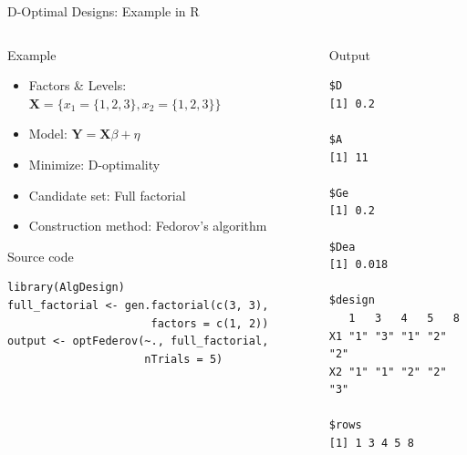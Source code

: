 \documentclass[10pt, compress, aspectratio=169, xcolor={table,usenames,dvipsnames}]{beamer}
\begin{document}
\begin{frame}[fragile,label={sec:org8845ca8}]{D-Optimal Designs: Example in R}
 \begin{columns}
\begin{column}{0.5\columnwidth}
\begin{block}{Example}
\begin{itemize}
\item Factors \& Levels: \(\mathbf{X} = \{x_1 = \{1, 2, 3\}, x_2 = \{1, 2, 3\}\}\)
\item Model: \(\mathbf{Y} = \mathbf{X}\beta + \eta\)
\item Minimize: \alert{D-optimality}
\item Candidate set: \alert{Full factorial}
\item Construction method: \alert{Fedorov's algorithm}
\end{itemize}

\begin{block}{Source code}
\lstset{language=r,label= ,caption= ,captionpos=b,numbers=none}
\begin{lstlisting}
library(AlgDesign)
full_factorial <- gen.factorial(c(3, 3),
                      factors = c(1, 2))
output <- optFederov(~., full_factorial,
                     nTrials = 5)
\end{lstlisting}
\end{block}
\end{block}
\end{column}

\begin{column}{0.5\columnwidth}
\begin{block}{Output}
\scriptsize

\begin{verbatim}
$D
[1] 0.2

$A
[1] 11

$Ge
[1] 0.2

$Dea
[1] 0.018

$design
   1   3   4   5   8
X1 "1" "3" "1" "2" "2"
X2 "1" "1" "2" "2" "3"

$rows
[1] 1 3 4 5 8
\end{verbatim}

\normalsize
\end{block}
\end{column}
\end{columns}
\end{frame}
\end{document}
